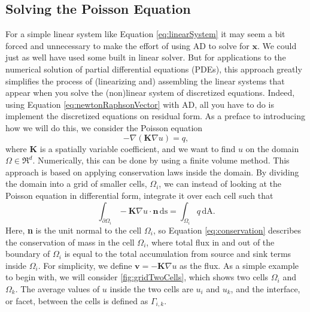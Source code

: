\subsection{Solving the Poisson Equation}
For a simple linear system like Equation \eqref{eq:linearSystem} it may seem a bit forced and unnecessary to make the effort of using AD to solve for $\boldsymbol{x}$. We could just as well have used some built in linear solver. But for applications to the numerical solution of partial differential equations (PDEs), this approach greatly simplifies the process of (linearizing and) assembling the linear systems that appear when you solve the (non)linear system of discretized equations. Indeed, using Equation \eqref{eq:newtonRaphsonVector} with AD, all you have to do is implement the discretized equations on residual form.  As a preface to introducing how we will do this, we consider the Poisson equation
\begin{equation}
    -\nabla(\textbf{K}\nabla u) = q,
    \label{eq:Poisson}
\end{equation}
where \textbf{K} is a spatially variable coefficient, and we want to find $u$ on the domain $\Omega \in \Re^d$. Numerically, this can be done by using a finite volume method. This approach is based on applying conservation laws inside the domain. By dividing the domain into a grid of smaller cells, $\Omega_i$, we can instead of looking at the Poisson equation in differential form, integrate it over each cell such that
\begin{equation}
    \int_{\partial\Omega_i}\!\!- \textbf{K} \nabla u \cdot \textbf{n}\, \mbox{ds} = \int_{\Omega_i} q \,\mbox{dA}.
    \label{eq:conservation}
\end{equation}
Here, \textbf{n} is the unit normal to the cell $\Omega_i$, so Equation \eqref{eq:conservation} describes the conservation of mass in the cell $\Omega_i$, where total flux in and out of the boundary of $\Omega_i$ is equal to the total accumulation from source and sink terms inside $\Omega_i$. For simplicity, we define $\textbf{v} = - \textbf{K} \nabla u$ as the flux. As a simple example to begin with, we will consider \autoref{fig:gridTwoCells}, which shows two cells $\Omega_i$ and $\Omega_k$. The average values of $u$ inside the two cells are $u_i$ and $u_k$, and the interface, or facet, between the cells is defined as $\Gamma_{i,k}$.
